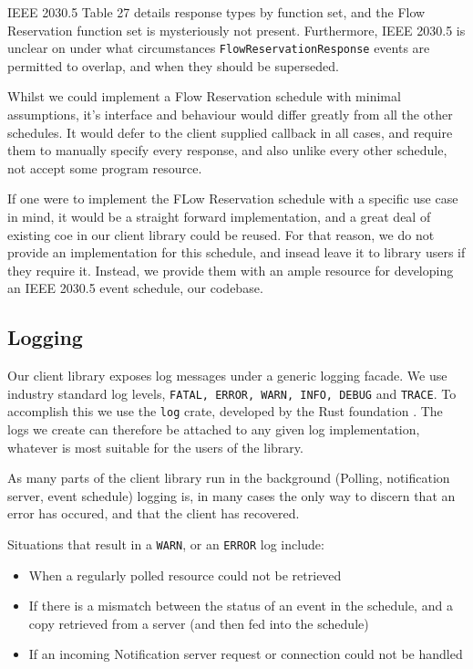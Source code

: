 IEEE 2030.5 Table 27 details response types by function set, and the Flow Reservation function set is mysteriously not present. Furthermore, IEEE 2030.5 is unclear on under what circumstances \texttt{FlowReservationResponse} events are permitted to overlap, and when they should be superseded. 

Whilst we could implement a Flow Reservation schedule with minimal assumptions, it's interface and behaviour would differ greatly from all the other schedules. It would defer to the client supplied callback in all cases, and require them to manually specify every response, and also unlike every other schedule, not accept some program resource.

If one were to implement the FLow Reservation schedule with a specific use case in mind, it would be a straight forward implementation, and a great deal of existing coe in our client library could be reused. For that reason, we do not provide an implementation for this schedule, and insead leave it to library users if they require it. Instead, we provide them with an ample resource for developing an IEEE 2030.5 event schedule, our codebase.

\subsection{Logging}
Our client library exposes log messages under a generic logging facade. We use industry standard log levels, \texttt{FATAL, ERROR, WARN, INFO, DEBUG} and \texttt{TRACE}. To accomplish this we use the \texttt{log} crate, developed by the Rust foundation \cite{logcrate}. The logs we create can therefore be attached to any given log implementation, whatever is most suitable for the users of the library.

As many parts of the client library run in the background (Polling, notification server, event schedule) logging is, in many cases the only way to discern that an error has occured, and that the client has recovered. 

Situations that result in a \texttt{WARN}, or an \texttt{ERROR} log include:

\begin{itemize}
    \item When a regularly polled resource could not be retrieved
    \item If there is a mismatch between the status of an event in the schedule, and a copy retrieved from a server (and then fed into the schedule)
    \item If an incoming Notification server request or connection could not be handled
\end{itemize}

